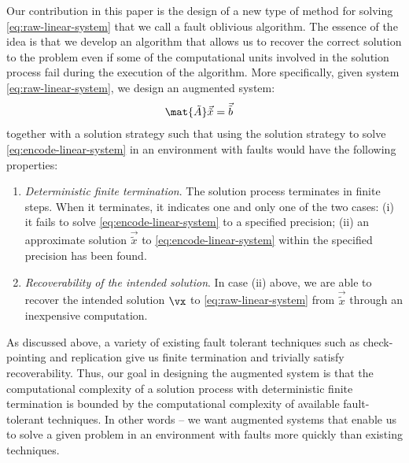 \documentclass[11pt]{article}
\newcommand{\tA}{\mat{\tilde{A}}}
\newcommand{\tb}{\vec{\tilde{b}}}
\newcommand{\tx}{\vec{\tilde{x}}}
\begin{document}
Our contribution in this paper is the design of a new type of method for
solving \eqref{eq:raw-linear-system} that we call a fault oblivious algorithm.
The essence of the idea is that we develop an algorithm that allows us to recover
the correct solution to the problem even if some of the computational units involved
in the solution process fail during the execution of the algorithm.  More specifically,
given system \eqref{eq:raw-linear-system}, we design an augmented system:
\begin{align}
\tA\tx&=\tb
\label{eq:encode-linear-system}
\end{align}
together with a solution strategy such that using the solution strategy to solve
\eqref{eq:encode-linear-system} in an environment with faults would have the following
properties:
\begin{enumerate}[1.]
\item \textit{Deterministic finite termination}. The solution process terminates in
finite steps. When it terminates, it indicates one and only one of the two cases:
(i) it fails to solve \eqref{eq:encode-linear-system} to a specified precision;
(ii) an approximate solution $\tx$ to \eqref{eq:encode-linear-system} within the
specified precision has been found.
\item \textit{Recoverability of the intended solution}. In case (ii) above, we
are able to recover the intended solution $\vx$ to \eqref{eq:raw-linear-system}
from $\tx$ through an inexpensive computation.
\end{enumerate}
As discussed above, a variety of existing fault tolerant techniques such as
check-pointing and replication give us finite termination and trivially satisfy
recoverability. Thus, our goal in designing the augmented system is that the
computational complexity of a solution process with deterministic finite termination
is bounded by the computational complexity of available fault-tolerant techniques.
In other words -- we want augmented systems that enable us to solve a given problem in
an environment with faults more quickly than existing techniques.
\end{document}
